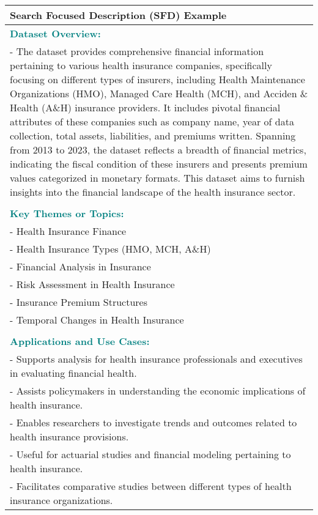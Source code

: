 \begin{table*}
    \small
    \centering
    \begin{tabular}{p{14cm}}
    \toprule
    \textbf{Search Focused Description (SFD) Example} \\
    \midrule
    \textcolor{teal}{\textbf{Dataset Overview:}} \\
    - The dataset provides comprehensive financial information pertaining to various health insurance companies, specifically focusing on different types of insurers, including Health Maintenance Organizations (HMO), Managed Care Health (MCH), and Acciden \& Health (A\&H) insurance providers. It includes pivotal financial attributes of these companies such as company name, year of data collection, total assets, liabilities, and premiums written. Spanning from 2013 to 2023, the dataset reflects a breadth of financial metrics, indicating the fiscal condition of these insurers and presents premium values categorized in monetary formats. This dataset aims to furnish insights into the financial landscape of the health insurance sector.
    \\\\
    \textcolor{teal}{\textbf{Key Themes or Topics:}} \\
    - Health Insurance Finance \\
    - Health Insurance Types (HMO, MCH, A\&H) \\
    - Financial Analysis in Insurance \\
    - Risk Assessment in Health Insurance \\
    - Insurance Premium Structures \\
    - Temporal Changes in Health Insurance \\
    \\
    \textcolor{teal}{\textbf{Applications and Use Cases:}} \\
    - Supports analysis for health insurance professionals and executives in evaluating financial health. \\
    - Assists policymakers in understanding the economic implications of health insurance. \\
    - Enables researchers to investigate trends and outcomes related to health insurance provisions. \\
    - Useful for actuarial studies and financial modeling pertaining to health insurance. \\
    - Facilitates comparative studies between different types of health insurance organizations. \\

\end{tabular}
\end{table*}
